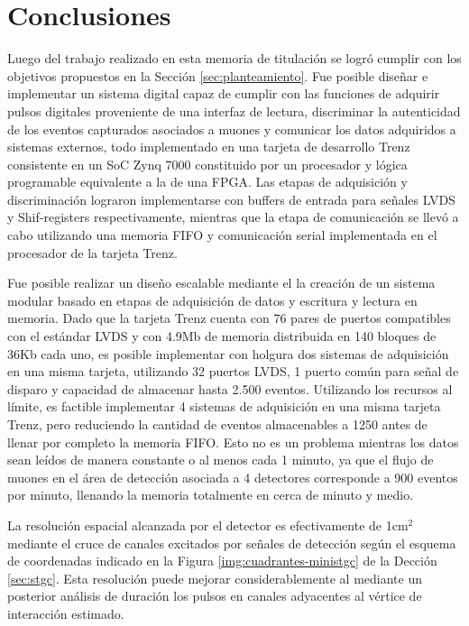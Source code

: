 \section{Conclusiones}
\label{sec:conc}

Luego del trabajo realizado en esta memoria de titulación se logró cumplir con los objetivos propuestos en la Sección \ref{sec:planteamiento}. Fue posible diseñar e implementar un sistema digital capaz de cumplir con las funciones de adquirir pulsos digitales proveniente de una interfaz de lectura, discriminar la autenticidad de los eventos capturados asociados a muones y comunicar los datos adquiridos a sistemas externos, todo implementado en una tarjeta de desarrollo Trenz consistente en un SoC Zynq 7000 constituido por un procesador y lógica programable equivalente a la de una FPGA. Las etapas de adquisición y discriminación lograron implementarse con buffers de entrada para señales LVDS y Shif-registers respectivamente, mientras que la etapa de comunicación se llevó a cabo utilizando una memoria FIFO y comunicación serial implementada en el procesador de la tarjeta Trenz.

Fue posible realizar un diseño escalable mediante el la creación de un sistema modular basado en etapas de adquisición de datos y escritura y lectura en memoria. Dado que la tarjeta Trenz cuenta con 76 pares de puertos compatibles con el estándar LVDS y con 4.9Mb de memoria distribuida en 140 bloques de 36Kb cada uno, es posible implementar con holgura dos sistemas de adquisición en una misma tarjeta, utilizando 32 puertos LVDS, 1 puerto común para señal de disparo y capacidad de almacenar hasta 2.500 eventos. Utilizando los recursos al límite, es factible implementar 4 sistemas de adquisición en una misma tarjeta Trenz, pero reduciendo la cantidad de eventos almacenables a 1250 antes de llenar por completo la memoria FIFO. Esto no es un problema mientras los datos sean leídos de manera constante o al menos cada 1 minuto, ya que el flujo de muones en el área de detección asociada a 4 detectores corresponde a 900 eventos por minuto, llenando la memoria totalmente en cerca de minuto y medio.

La resolución espacial alcanzada por el detector es efectivamente de 1cm$^2$ mediante el cruce de canales excitados por señales de detección según el esquema de coordenadas indicado en la Figura \ref{img:cuadrantes-ministgc} de la Dección \ref{sec:stgc}. Esta resolución puede mejorar considerablemente al mediante un posterior análisis de duración los pulsos en canales adyacentes al vértice de interacción estimado. 

